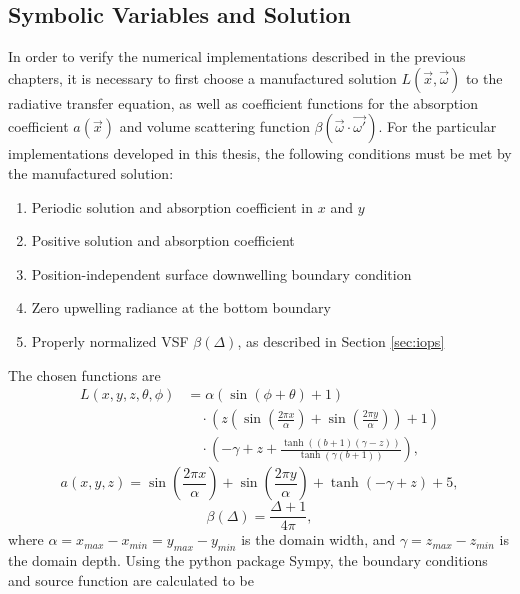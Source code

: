 \subsection{Symbolic Variables and Solution}
In order to verify the numerical implementations described in the previous chapters, it is necessary to first choose a manufactured solution $L(\vec{x}, \vec{\omega})$ to the radiative transfer equation, as well as coefficient functions for the absorption coefficient $a(\vec{x})$ and volume scattering function $\beta(\vec{\omega}\cdot\vec{\omega'})$.
For the particular implementations developed in this thesis, the following conditions must be met by the manufactured solution:
\begin{enumerate}
  \item Periodic solution and absorption coefficient in $x$ and $y$
  \item Positive solution and absorption coefficient
  \item Position-independent surface downwelling boundary condition
  \item Zero upwelling radiance at the bottom boundary
  \item Properly normalized VSF $\beta(\Delta)$, as described in Section \ref{sec:iops}
\end{enumerate}
The chosen functions are
\begin{align}
  L(x, y, z, \theta, \phi) &=
    \alpha \left(\sin{\left (\phi + \theta \right )} + 1\right) \nonumber\\
    &\quad\cdot \left(z \left(\sin{\left (\frac{2 \pi x}{\alpha} \right )} + \sin{\left (\frac{2 \pi y}{\alpha} \right )}\right) + 1\right) \nonumber\\
    &\quad\cdot \left(- \gamma + z + \frac{\tanh{\left (\left(b + 1\right) \left(\gamma - z\right) \right )}}{\tanh{\left (\gamma \left(b + 1\right) \right )}}\right),
  \label{eqn:mms_sol_expr}
\end{align}
\begin{equation}
  a(x, y, z) = \sin{\left (\frac{2 \pi x}{\alpha} \right )} + \sin{\left (\frac{2 \pi y}{\alpha} \right )} + \tanh{\left (- \gamma + z \right )} + 5,
  \label{eqn:mms_abs_expr}
\end{equation}
\begin{equation}
  \beta(\Delta) = \frac{\Delta + 1}{4 \pi},
  \label{eqn:mms_vsf_expr}
\end{equation}
where $\alpha=x_{max}-x_{min}=y_{max}-y_{min}$ is the domain width, and $\gamma=z_{max}-z_{min}$ is the domain depth.
Using the python package Sympy, the boundary conditions and source function are calculated to be
